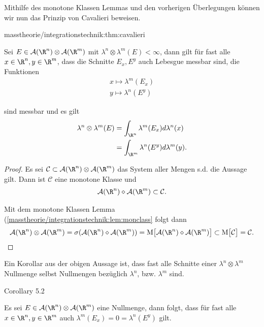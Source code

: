 \documentclass[letterpaper,10pt,german]{jupyterBook}
\begin{document}
\par
Mithilfe des monotone Klassen Lemmas und den vorherigen Überlegungen können wir nun das Prinzip von Cavalieri beweisen.
\begin{theorem}{}{masstheorie/integrationstechnik:thm:cavalieri}



\par
Sei \(E \in \mathcal{A}(\R^n)\otimes\mathcal{A}(\R^m)\) mit \(\lambda^{n}\otimes\lambda^{m}(E) < \infty\),
dann gilt für fast alle \(x\in\R^n,y\in\R^m\), dass die Schnitte \(E_x, E^y\) auch Lebesgue messbar sind, die Funktionen
\begin{align*}
x \mapsto \lambda^m(E_x)\\
y \mapsto \lambda^n(E^y)
\end{align*}
\par
sind messbar und es gilt
\begin{align*}
\lambda^{n}\otimes\lambda^{m}(E) &= \int_{\R^n} \lambda^m(E_x) d\lambda^n(x)\\
&=
\int_{\R^m} \lambda^n(E^y) d\lambda^m(y).
\end{align*}\end{theorem}

\begin{proof}
 Es sei \(\mathcal{C}\subset\mathcal{A}(\R^n)\otimes\mathcal{A}(\R^m)\) das System aller Mengen s.d. die Aussage gilt. Dann ist \(\mathcal{C}\) eine monotone Klasse und
\begin{align*}
\mathcal{A}(\R^n)\diamond\mathcal{A}(\R^m)\subset \mathcal{C}.
\end{align*}
\par
Mit dem monotone Klassen Lemma (\cref{masstheorie/integrationstechnik:lem:monclass}  folgt dann
\begin{align*}
\mathcal{A}(\R^n)\otimes\mathcal{A}(\R^m) = \sigma(\mathcal{A}(\R^n)\diamond\mathcal{A}(\R^m)) = 
\text{M}\big[\mathcal{A}(\R^n)\diamond\mathcal{A}(\R^m)\big] \subset 
\text{M}\big[\mathcal{C}\big] = \mathcal{C}.
\end{align*}\end{proof}

\par
Ein Korollar aus der obigen Aussage ist, dass fast alle Schnitte einer \(\lambda^n\otimes\lambda^m\) Nullmenge selbst Nullmengen bezüglich \(\lambda^n\), bzw. \(\lambda^m\) sind.
\label{masstheorie/integrationstechnik:cor:zeroprodset}
\begin{emphBox}{}{}{Corollary 5.2}



\par
Es sei \(E\in\mathcal{A}(\R^n)\otimes\mathcal{A}(\R^m)\) eine Nullmenge, dann folgt, dass für fast alle \(x\in\R^n,y\in\R^m\) auch \(\lambda^m(E_x)=0=\lambda^n(E^y)\) gilt.
\end{emphBox}
\end{document}

